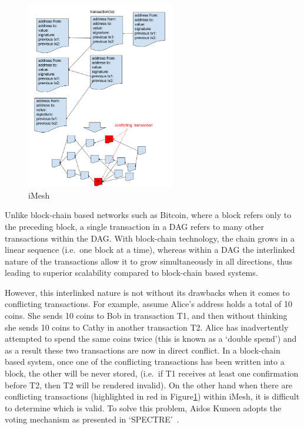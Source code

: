 \documentclass[a4paper,10pt,twocolumn]{article}
\begin{document}
\begin{figure}[ht]
	\begin{center}
	\includegraphics[width=65mm]{dag.png}
	  \caption{iMesh}
    \label{fig:imesh}
	\end{center}
 \end{figure}

Unlike block-chain based networks such as Bitcoin, where a block refers only to the preceding block, a single transaction in a DAG 
refers to many other transactions within the DAG\@. With block-chain technology, the chain grows in a linear sequence (i.e.\ one block at a 
time), whereas within a DAG the interlinked nature of the transactions allow it to grow simultaneously in all directions, thus leading 
to superior scalability compared to block-chain based systems.

However, this interlinked nature is not without its drawbacks when it comes to conflicting transactions. For example, assume Alice's 
address holds a total of 10 coins. She sends 10 coins to Bob in transaction T1, and then without thinking she sends 10 coins to Cathy 
in another transaction T2. Alice has inadvertently attempted to spend the same coins twice (this is known as a `double spend')
and as a result these two transactions are now in direct conflict. In a block-chain based system, once one of the conflicting 
transactions has been written into a block, the other will be never stored, (i.e.\ if T1 receives at least one confirmation before T2, 
then T2 will be rendered invalid). On the other hand when there are conflicting transactions (highlighted in red in 
Figure\ref{fig:imesh}) within iMesh, it is difficult to determine which is valid. To solve this problem, Aidos Kuneen adopts the voting 
mechanism as presented in `SPECTRE'~\cite{spectre}.
\end{document}
